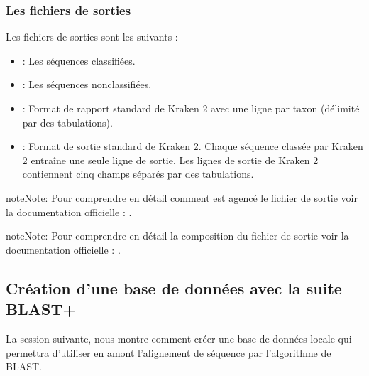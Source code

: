 \documentclass[letterpaper,10pt,french]{sphinxmanual}
\begin{document}
\subsubsection{Les fichiers de sorties}
\label{\detokenize{tutorial:id30}}
Les fichiers de sorties sont les suivants :
\begin{itemize}
\item {} 
 : Les séquences classifiées.

\item {} 
 : Les séquences non\sphinxhyphen{}classifiées.

\item {} 
 : Format de rapport standard de Kraken 2 avec une ligne par taxon (délimité par des tabulations).

\item {} 
 : Format de sortie standard de Kraken 2. Chaque séquence classée par Kraken 2 entraîne une seule ligne de sortie. Les lignes de sortie de Kraken 2 contiennent cinq champs séparés par des tabulations.

\end{itemize}

\begin{sphinxadmonition}{note}{Note:}
Pour comprendre en détail comment est agencé le fichier de sortie  voir la documentation officielle :  .
\end{sphinxadmonition}

\begin{sphinxadmonition}{note}{Note:}
Pour comprendre en détail la composition du fichier de sortie  voir la documentation officielle :  .
\end{sphinxadmonition}


\subsection{Création d’une base de données avec la suite BLAST+}
\label{\detokenize{tutorial:creation-d-une-base-de-donnees-avec-la-suite-blast}}\label{\detokenize{tutorial:creation-database-blast}}
La session suivante, nous montre comment créer une base de données locale qui permettra d’utiliser en amont l’alignement de séquence par l’algorithme de BLAST.
\end{document}
